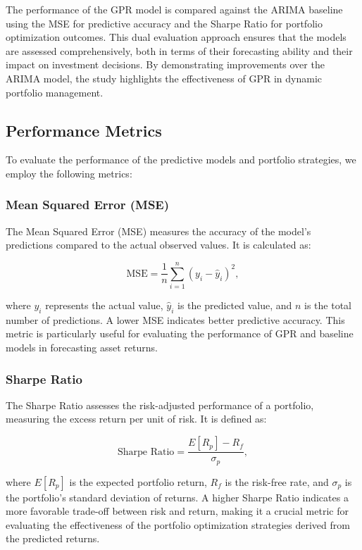 The performance of the \ac{GPR} model is compared against the \ac{ARIMA} baseline using the \ac{MSE} for predictive accuracy and the Sharpe Ratio for portfolio optimization outcomes. This dual evaluation approach ensures that the models are assessed comprehensively, both in terms of their forecasting ability and their impact on investment decisions. By demonstrating improvements over the \ac{ARIMA} model, the study highlights the effectiveness of \ac{GPR} in dynamic portfolio management.

\subsection{Performance Metrics}

To evaluate the performance of the predictive models and portfolio strategies, we employ the following metrics:

\subsubsection{Mean Squared Error (MSE)}

The Mean Squared Error (MSE) measures the accuracy of the model's predictions compared to the actual observed values. It is calculated as:

\begin{equation}
\text{MSE} = \frac{1}{n} \sum_{i=1}^{n} \left( y_i - \hat{y}_i \right)^2,
\end{equation}

where $y_i$ represents the actual value, $\hat{y}_i$ is the predicted value, and $n$ is the total number of predictions. A lower MSE indicates better predictive accuracy. This metric is particularly useful for evaluating the performance of GPR and baseline models in forecasting asset returns.

\subsubsection{Sharpe Ratio}

The Sharpe Ratio assesses the risk-adjusted performance of a portfolio, measuring the excess return per unit of risk. It is defined as:

\begin{equation}
\text{Sharpe Ratio} = \frac{E[R_p] - R_f}{\sigma_p},
\end{equation}

where $E[R_p]$ is the expected portfolio return, $R_f$ is the risk-free rate, and $\sigma_p$ is the portfolio's standard deviation of returns. A higher Sharpe Ratio indicates a more favorable trade-off between risk and return, making it a crucial metric for evaluating the effectiveness of the portfolio optimization strategies derived from the predicted returns.

